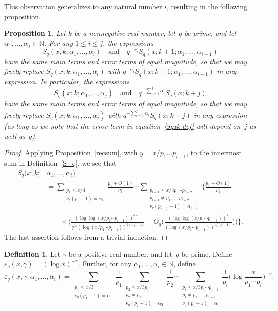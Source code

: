 \documentclass[12pt,reqno]{amsart}
\newtheorem{proposition}[theorem]{Proposition}
\theoremstyle{definition}
\newtheorem{definition}[theorem]{Definition}
\newcommand{\N}{{\mathbb N}}
\newcommand{\ep}{\varepsilon}
\begin{document}
This observation generalizes to any natural number $i$, resulting in the following proposition. 

\begin{proposition} \label{recarg}
Let $k$ be a nonnegative real number, let~$q$ be prime, and let $\alpha_1,\ldots,\alpha_j\in\N$.
For any $1\le i\le j$, the expressions
\[
S_q(x;k;\alpha_1,\ldots,\alpha_i) \quad\text{and}\quad {q^{-\alpha_i}}S_q(x;k+1;\alpha_1,\ldots,\alpha_{i-1})
\]
have the same main terms and error terms of equal magnitude, so that we may freely replace $S_q(x;k;\alpha_1,\ldots,\alpha_i)$ with ${q^{-\alpha_i}} S_q(x;k+1;\alpha_1,\ldots,\alpha_{i-1})$ in any expression.
In particular, the expressions
\[
S_q(x;k;\alpha_1,\ldots,\alpha_j) \quad\text{and}\quad {q^{-\sum_{i=1}^j \alpha_i}} S_q(x;k+j)
\]
have the same main terms and error terms of equal magnitude, so that we may freely replace $S_q(x;k;\alpha_1,\ldots,\alpha_j)$ with ${q^{-\sum_{i=1}^j \alpha_i}}S_q(x;k+j)$ in any expression (as long as we note that the error term in equation~\eqref{Sqxk def} will depend on~$j$ as well as~$q$).
\end{proposition}

\begin{proof}
Applying Proposition~\ref{recsum}, with $y=x/p_1\dots p_{i-1}$, to the innermost sum in Definition~\ref{S_q}, we see that
\begin{align*}
S_q(x;k;&\alpha_1,\ldots,\alpha_i)\\
&=\sum_{\substack{p_1\le x/3\\\nu_q(p_1-1)=\alpha_1}} \frac{p_1+O(1)}{p_1^2} \cdots\sum_{\substack{p_{i-1}\le x/3p_1\cdots p_{i-2}\\p_{i-1}\ne p_1,\ldots,p_{i-2}\\\nu_q(p_{i-1}-1)=\alpha_{i-1}}} \bigg\{ \frac{p_1+O(1)}{p_1^2} \\
&\qquad{}\times \bigg( \frac{(\log\log(x/p_1\cdots p_{i-1}))^{k+1}}{q^{\alpha_i}(\log(x/p_1\cdots p_{i-1}))^{1/(q-1)}}+O_q\bigg( \frac {(\log\log(x/p_1\cdots p_{i-1}))^{k}}{(\log(x/p_1\cdots p_{i-1}))^{1/(q-1)}}\bigg) \bigg) \bigg\}.
\end{align*}
The last assertion follows from a trivial induction.
\end{proof}

\begin{definition}\label{ep_q}
Let $\gamma$ be a positive real number, and let~$q$ be prime. Define $\ep_q(x,\gamma) = (\log x)^{-\gamma}$.
Further, for any $\alpha_1,\ldots,\alpha_i\in\N$, define
\[
\ep_q(x,\gamma;\alpha_1,\ldots,\alpha_i)=\sum_{\substack{p_1\le x/3\\\nu_q(p_1-1)=\alpha_1}}\frac 1{p_1}\sum_{\substack{p_2\le x/3p_1\\p_2\ne p_1\\\nu_q(p_2-1)=\alpha_2}}\frac 1{p_2}\cdots \sum_{\substack{p_i\le x/3p_1\cdots p_{i-1}\\p_i\ne p_1,\ldots,p_{i-1}\\\nu_q(p_i-1)=\alpha_i}}\frac 1{p_i}\bigg( \log\frac x{p_1 \cdots p_i}\bigg)^{-\gamma}.
\]
\end{definition}
\end{document}
